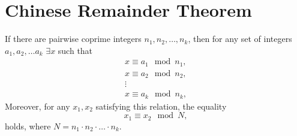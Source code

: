 \section{Chinese Remainder Theorem}

\begin{theorem}
\label{thm:chineseremainder}
If there are pairwise coprime integers $n_1, n_2, \dots, n_k$, then
for any set of integers $a_1, a_2, \dots a_k$ $\exists x$ such
that 
\begin{eqnarray}
x \equiv a_1 \mod n_1,
\nonumber \\
x \equiv a_2 \mod n_2,
\nonumber \\
\vdots \nonumber \\
x \equiv a_k \mod n_k,
\end{eqnarray}
Moreover, for any $x_1, x_2$ satisfying this relation, the equality
\[
x_1 \equiv x_2 \mod N,
\]
holds, where $N = n_1 \cdot n_2 \cdot \dots \cdot n_k$.
\end{theorem}